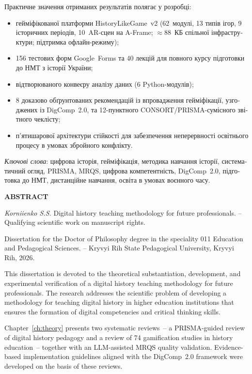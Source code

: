 {\begin{otherlanguage}{ukrainian}
{Практичне значення отриманих результатів полягає у розробці:
\begin{itemize}
\item гейміфікованої платформи HistoryLikeGame~v2 (62~модулі, 13 типів
  ігор, 9 історичних періодів, 10~AR-сцен на A-Frame; $\approx$88~КБ
  спільної інфраструктури; підтримка офлайн-режиму);
\item 156 тестових форм Google~Forms та 40 лекцій для повного курсу
  підготовки до НМТ з історії України;
\item відтворюваного конвеєру аналізу даних (6 Python-модулів);
\item 8 доказово обґрунтованих рекомендацій із впровадження
  гейміфікації, узгоджених із DigComp~2.0, та
  12-пунктного CONSORT/PRISMA-сумісного звітного чеклісту;
\item п'ятишарової архітектури стійкості для забезпечення
  неперервності освітнього процесу в умовах збройного конфлікту.
\end{itemize}

\textit{Ключові слова}: цифрова історія, гейміфікація, методика навчання історії, систематичний огляд, PRISMA, MRQS, цифрова компетентність, DigComp~2.0, підготовка до НМТ, дистанційне навчання, освіта в умовах воєнного часу.}

\end{otherlanguage}

{}
\begin{center}
\large
    \textbf{ABSTRACT}
\end{center}

\textit{Korniienko S.S.} Digital history teaching methodology for future professionals. -- Qualifying scientific work on manuscript rights.

Dissertation for the Doctor of Philosophy degree in the speciality 011 Education and Pedagogical Sciences. -- Kryvyi Rih State Pedagogical University, Kryvyi Rih, 2026.

{This dissertation is devoted to the theoretical substantiation, development, and experimental verification of a digital history teaching methodology for future professionals. The research addresses the scientific problem of developing a methodology for teaching digital history in higher education institutions that ensures the formation of digital competencies and critical thinking skills.

Chapter~\ref{ch:theory} presents two systematic reviews~-- a PRISMA-guided review of digital history pedagogy and a review of 74 gamification studies in history education~-- together with an LLM-assisted MRQS quality validation. Evidence-based implementation guidelines aligned with the DigComp~2.0 framework were developed on the basis of these reviews.

}}

